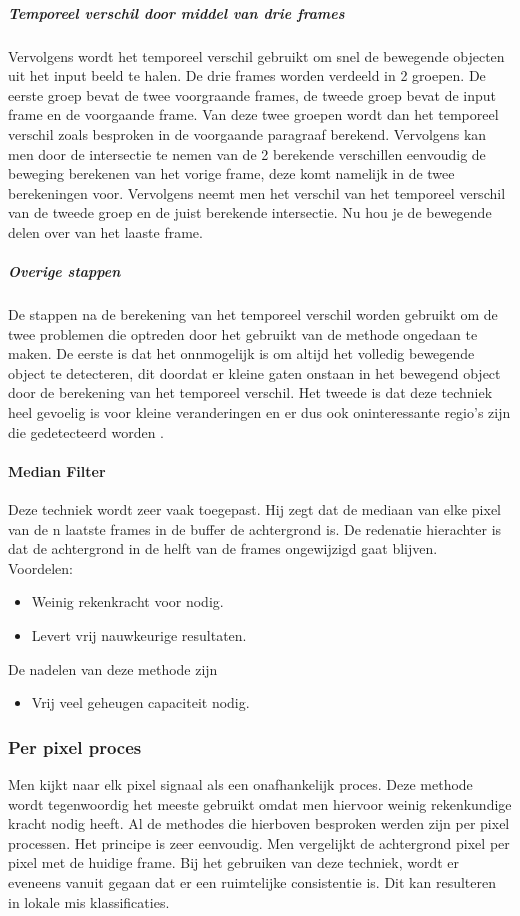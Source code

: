 \subparagraph{Temporeel verschil door middel van drie frames}
Vervolgens wordt het temporeel verschil gebruikt om snel de bewegende objecten uit het input beeld te halen. De drie frames worden verdeeld in 2 groepen. De eerste groep bevat de twee voorgraande frames, de tweede groep bevat de input frame en de voorgaande frame. Van deze twee groepen wordt dan het temporeel verschil zoals besproken in de voorgaande paragraaf berekend. Vervolgens kan men door de intersectie te nemen van de 2 berekende verschillen eenvoudig de beweging berekenen van het vorige frame, deze komt namelijk in de twee berekeningen voor. Vervolgens neemt men het verschil van het temporeel verschil van de tweede groep en de juist berekende intersectie. Nu hou je de bewegende delen over van het laaste frame. 

\subparagraph{Overige stappen}
De stappen na de berekening van het temporeel verschil worden gebruikt om de twee problemen die optreden door het gebruikt van de methode ongedaan te maken. De eerste is dat het onnmogelijk is om altijd het volledig bewegende object te detecteren, dit doordat er kleine gaten onstaan in het bewegend object door de berekening van het temporeel verschil. Het tweede is dat deze techniek heel gevoelig is voor kleine veranderingen en er dus ook oninteressante regio's zijn die gedetecteerd worden \cite{bibTeV}.

\paragraph{Median Filter}
\label{refMEF}
Deze techniek wordt zeer vaak toegepast. Hij zegt dat de mediaan van elke pixel van de n laatste  frames in de buffer de achtergrond is. De redenatie hierachter is dat de achtergrond in de helft van de frames ongewijzigd gaat blijven.\\
Voordelen:
\begin{itemize}
	\item Weinig rekenkracht voor nodig.
	\item Levert vrij nauwkeurige resultaten.
\end{itemize}
De nadelen van deze methode zijn
\begin{itemize}
	\item Vrij veel geheugen capaciteit nodig.
\end{itemize}

\subsubsection{Per pixel proces}
\label{refPPP}
Men kijkt naar elk pixel signaal als een onafhankelijk proces. Deze methode wordt tegenwoordig het meeste gebruikt omdat men hiervoor weinig rekenkundige kracht nodig heeft. Al de methodes die hierboven besproken werden zijn per pixel processen. Het principe is zeer eenvoudig. Men vergelijkt de achtergrond pixel per pixel met de huidige frame. Bij het gebruiken van deze techniek, wordt er eveneens vanuit gegaan dat er een ruimtelijke consistentie is. Dit kan resulteren in lokale mis klassificaties. \cite{bibBET8}

